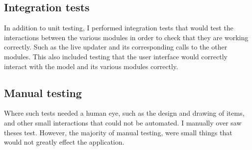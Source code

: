 \subsection{Integration tests}
\label{subsec:integration_tests}

In addition to unit testing, I performed integration tests that would test the interactions between the various modules in order to check that they are working correctly. Such as the live updater and its corresponding calls to the other modules. This also included testing that the user interface would correctly interact with the model and its various modules correctly.

\subsection{Manual testing}
\label{subsec:mamual_tests}

Where such tests needed a human eye, such as the design and drawing of items, and other small interactions that could not be automated. I manually over saw theses test. However, the majority of manual testing, were small things that would not greatly effect the application.
